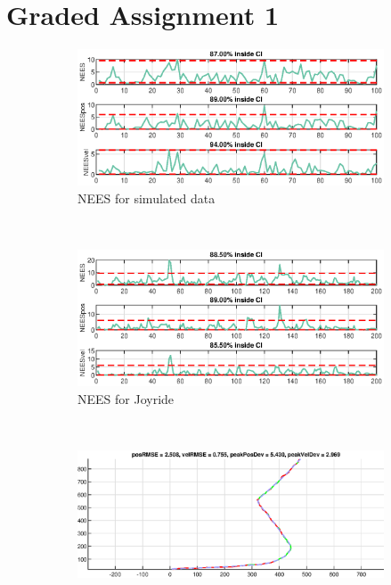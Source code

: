 \section{Graded Assignment 1}\label{sec:graded_assignment_1}

\begin{figure}[ht]
	\begin{subfigure}[h]{0.4\textwidth}
		\includegraphics[width=\textwidth]{figures/ga_1/2_NEES}
		\caption{NEES for simulated data}
		\label{fig:ga_1_2_NEES}
    \end{subfigure}%
    ~
	\begin{subfigure}[h]{0.4\textwidth}
		\includegraphics[width=\textwidth]{figures/ga_1/joyride_NEES}
		\caption{NEES for Joyride}
		\label{fig:ga_1_joyride_NEES}
	\end{subfigure}
        \\
    \begin{subfigure}[h]{0.4\textwidth}
        \includegraphics[width=\textwidth]{figures/ga_1/2_estimated_trajectory}

\end{subfigure}
\end{figure}
